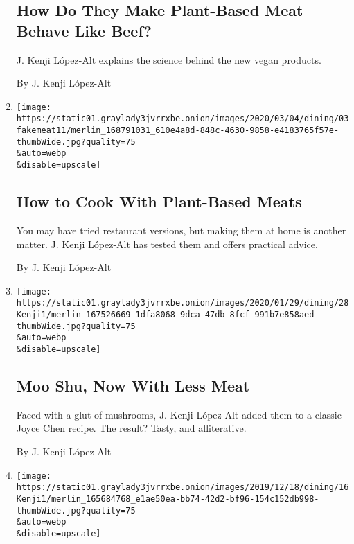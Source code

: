 \begin{enumerate}
{  \subsection{How Do They Make Plant-Based Meat Behave Like
  Beef?}\label{how-do-they-make-plant-based-meat-behave-like-beef}}

  J. Kenji López-Alt explains the science behind the new vegan products.

  By J. Kenji López-Alt
\item
  \href{/2020/03/03/dining/impossible-beyond-meat.html}{}

  \texttt{[image: https://static01.graylady3jvrrxbe.onion/images/2020/03/04/dining/03fakemeat11/merlin\_168791031\_610e4a8d-848c-4630-9858-e4183765f57e-thumbWide.jpg?quality=75\\\&auto=webp\\\&disable=upscale]}

  \hypertarget{how-to-cook-with-plant-based-meats}{%
  \subsection{How to Cook With Plant-Based
  Meats}\label{how-to-cook-with-plant-based-meats}}

  You may have tried restaurant versions, but making them at home is
  another matter. J. Kenji López-Alt has tested them and offers
  practical advice.

  By J. Kenji López-Alt
\item
  \href{/2020/01/27/dining/kenji-moo-shu-mushrooms-recipe.html}{}

  \texttt{[image: https://static01.graylady3jvrrxbe.onion/images/2020/01/29/dining/28Kenji1/merlin\_167526669\_1dfa8068-9dca-47db-8fcf-991b7e858aed-thumbWide.jpg?quality=75\\\&auto=webp\\\&disable=upscale]}

  \hypertarget{moo-shu-now-with-less-meat}{%
  \subsection{Moo Shu, Now With Less
  Meat}\label{moo-shu-now-with-less-meat}}

  Faced with a glut of mushrooms, J. Kenji López-Alt added them to a
  classic Joyce Chen recipe. The result? Tasty, and alliterative.

  By J. Kenji López-Alt
\item
  \href{/2019/12/16/dining/kenji-biscuit-recipe.html}{}

  \texttt{[image: https://static01.graylady3jvrrxbe.onion/images/2019/12/18/dining/16Kenji1/merlin\_165684768\_e1ae50ea-bb74-42d2-bf96-154c152db998-thumbWide.jpg?quality=75\\\&auto=webp\\\&disable=upscale]}


\end{enumerate}
